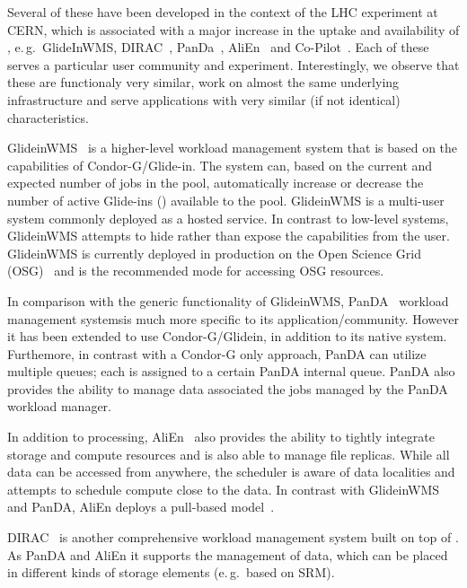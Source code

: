 \documentclass{sig-alternate}
\begin{document}
Several of these have been developed in the context of the LHC
experiment at CERN, which is associated with a major increase in the
uptake and availability of \pilots, e.\,g.\ GlideInWMS,
DIRAC~\cite{1742-6596-219-6-062049},
PanDa~\cite{1742-6596-331-7-072069},
AliEn~\cite{1742-6596-119-6-062012} and Co-Pilot~\cite{copilot-tr}.
Each of these \pilots serves a particular user community and
experiment. Interestingly, we observe that these \pilots are
functionaly very similar, work on almost the same underlying
infrastructure and serve applications with very similar (if not
identical) characteristics.


GlideinWMS~\cite{1742-6596-119-6-062044} is a higher-level workload management
system that is based on the \pilot capabilities of Condor-G/Glide-in.
The system can, based on the current and expected number of jobs in the pool,
automatically increase or decrease the number of active Glide-ins (\pilots)
available to the pool.
GlideinWMS is a multi-user \pilotjob system commonly deployed as a hosted
service. In contrast to low-level \pilotjob systems, GlideinWMS attempts to
hide rather than expose the \pilot capabilities from the user.
GlideinWMS is currently deployed in production on the Open Science Grid
(OSG)~\cite{url_osg} and is the recommended mode for accessing OSG resources.

In comparison with the generic functionality of GlideinWMS,
PanDA~\cite{1742-6596-331-7-072069} workload management systemsis much
more specific to its application/community. However it has been
extended to use Condor-G/Glidein, in addition to its native \pilot
system.  Furthemore, in contrast with a Condor-G only approach, PanDA
can utilize multiple queues; each \pilot is assigned to a certain
PanDA internal queue. PanDA also provides the ability to manage data
associated the jobs managed by the PanDA workload manager.

In addition to processing, AliEn~\cite{1742-6596-119-6-062012} also provides
the ability to tightly integrate storage and compute resources and is also able
to manage file replicas.
While all data can be accessed from anywhere, the scheduler is aware
of data localities and attempts to schedule compute close to the data.
In contrast with GlideinWMS and PanDA, AliEn deploys a pull-based
model~\cite{Saiz:2003:alien}.

DIRAC~\cite{1742-6596-219-6-062049} is another comprehensive workload
management system built on top of \pilots.
As PanDA and AliEn it supports the management of data, which can be placed in
different kinds of storage elements (e.\,g.\ based on SRM).
\end{document}
